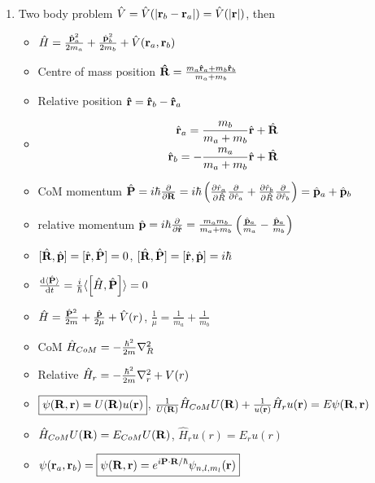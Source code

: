 \documentclass{article}
\theoremstyle{remark}
\theoremstyle{remark}
\begin{document}
\begin{enumerate}
    \item Two body problem $\hat{V} = \hat{V}(|\vb{r}_b-\vb{r}_a|) = \hat{V}(|\vb{r}|)$, then\begin{itemize}
        \item $\hat{H}=\frac{\hat{\vb p}_a^2}{2m_a}+\frac{\hat{\vb p}_b^2}{2m_b}+\hat{V}(\vb{r}_a,\vb{r}_b)$
        \item Centre of mass position $\vb{\hat R}=\frac{m_a\vb{\hat r}_a+m_b\vb{\hat r}_b}{m_a+m_b}$
        \item Relative position $\vb{\hat r}=\vb{\hat r}_b-\vb{\hat r}_a$
        \item \begin{align*}
            \hat{\vb{r}}_a = \frac{m_b}{m_a+m_b}\hat{\vb{r}}+\hat{\vb{R}}\\
            \hat{\vb{r}}_b = -\frac{m_a}{m_a+m_b}\hat{\vb{r}}+\hat{\vb{R}}
        \end{align*}
        \item CoM momentum $\hat{\vb{P}}=i\hbar\pdv{\vb{R}} = i\hbar\left(\pdv{\hat{r}_a}{\hat{R}}\pdv{\hat{r}_a}+\pdv{\hat{r}_b}{\hat{R}}\pdv{\hat{r}_b}\right) = \hat{\vb{p}}_a+\hat{\vb{p}}_b$
        \item relative momentum $\hat{\vb{p}}=i\hbar\pdv{\hat{\vb r}}=\frac{m_a m_b}{m_a+m_b}\left(\frac{\hat{\vb{p}}_a}{m_a}-\frac{\hat{\vb{p}}_a}{m_b}\right)$
        \item $[\hat{\vb R},\hat{\vb p}] = [\hat{\vb r},\hat{\vb P}] = 0$, $[\hat{\vb R},\hat{\vb P}]=[\hat{\vb r},\hat{\vb p}]=i\hbar$
        \item $\dv{\langle\hat{\vb P}\rangle}{t}=\frac{i}{\hbar}\langle \comm{\hat{H}}{\hat{\vb P}}\rangle = 0$
        \item $\hat{H}=\frac{\hat{\vb P}^2}{2m}+\frac{\hat{\vb p}}{2\mu}+\hat{V}(r)$, $\frac{1}{\mu}=\frac{1}{m_a}+\frac{1}{m_b}$
        \item CoM $\hat{H}_{CoM} = -\frac{\hbar^2}{2m}\laplacian_{R}$
        \item Relative $\hat{H}_r = -\frac{\hbar^2}{2m}\laplacian_{r}+V(r)$
        \item $\boxed{\psi(\vb{R},\vb{r})=U(\vb{R})u(\vb{r})}$, $\frac{1}{U(\vb{R})}\hat{H}_{CoM}U(\vb{R})+\frac{1}{u(\vb{r})}\hat{H}_r u(\vb{r})=E\psi(\vb{R},\vb{r})$
        \item $\hat{H}_{CoM}U(\vb{R})=E_{CoM}U(\vb{R})$, $\hat{H}_r u(r)=E_r u(r)$
        \item $\psi(\vb{r}_a,\vb{r}_b)=\boxed{\psi(\vb{R},\vb{r}) = e^{i\vb{P}\cdot\vb{R}/\hbar}\psi_{n,l,m_l}(\vb{r})}$

\end{itemize}
\end{enumerate}
\end{document}
